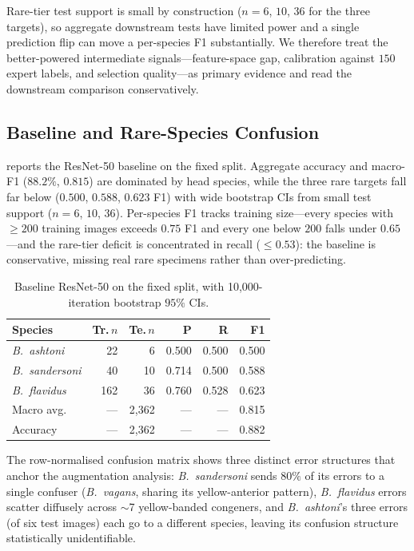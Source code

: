 \documentclass[runningheads]{llncs}
\begin{document}
Rare-tier test support is small by construction ($n{=}6$, $10$, $36$ for
the three targets), so aggregate downstream tests have limited power and
a single prediction flip can move a per-species F1 substantially. We
therefore treat the better-powered intermediate signals---feature-space
gap, calibration against $150$ expert labels, and selection quality---as
primary evidence and read the downstream comparison conservatively.

\subsection{Baseline and Rare-Species Confusion}
\label{sec:baseline}

 reports the ResNet-50 baseline on the fixed split.
Aggregate accuracy and macro-F1 ($88.2\%$, $0.815$) are dominated by
head species, while the three rare targets fall far below ($0.500$,
$0.588$, $0.623$ F1) with wide bootstrap CIs from small test support
($n{=}6$, $10$, $36$). Per-species F1 tracks training size---every
species with $\geq 200$ training images exceeds $0.75$ F1 and every one
below $200$ falls under $0.65$---and the rare-tier deficit is
concentrated in recall ($\leq 0.53$): the baseline is conservative,
missing real rare specimens rather than over-predicting.

\begin{table}[t]
  \caption{Baseline ResNet-50 on the fixed split, with
  10{,}000-iteration bootstrap $95\%$ CIs.}
  \label{tab:baseline}
  \centering
  \begin{tabular}{@{}lrrrrr@{}}
    \toprule
    Species & Tr.\,$n$ & Te.\,$n$ & P & R & F1 \\
    \midrule
    \emph{B.~ashtoni}    & 22  & 6  & 0.500 & 0.500 & 0.500 \\
    \emph{B.~sandersoni} & 40  & 10 & 0.714 & 0.500 & 0.588 \\
    \emph{B.~flavidus}   & 162 & 36 & 0.760 & 0.528 & 0.623 \\
    \midrule
    Macro avg.   & --- & 2{,}362 & --- & --- & 0.815 \\
    Accuracy     & --- & 2{,}362 & --- & --- & 0.882 \\
    \bottomrule
  \end{tabular}
\end{table}

The row-normalised confusion matrix shows three distinct error
structures that anchor the augmentation analysis: \emph{B.~sandersoni}
sends $80\%$ of its errors to a single confuser (\emph{B.~vagans},
sharing its yellow-anterior pattern), \emph{B.~flavidus} errors scatter
diffusely across $\sim$7 yellow-banded congeners, and
\emph{B.~ashtoni}'s three errors (of six test images) each go to a
different species, leaving its confusion structure statistically
unidentifiable.
\end{document}
